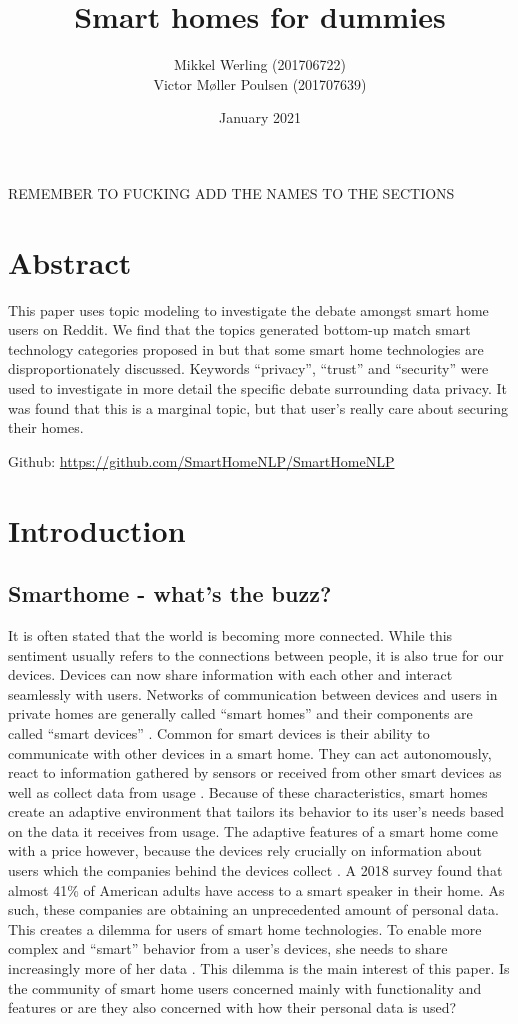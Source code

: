 \documentclass{article}
\title{Smart homes for dummies}
\author{Mikkel Werling (201706722) \\ Victor Møller Poulsen (201707639)}
\date{January 2021}
\begin{document}
    \maketitle
    REMEMBER TO FUCKING ADD THE NAMES TO THE SECTIONS 
    \section{Abstract}
    This paper uses topic modeling to investigate the debate amongst smart home users on Reddit. We find that the topics generated bottom-up match smart technology categories proposed in  but that some smart home technologies are disproportionately discussed. Keywords “privacy”, “trust” and “security” were used to investigate in more detail the specific debate surrounding data privacy. It was found that this is a marginal topic, but that user’s really care about securing their homes.  
    \begin{center}
    Github: \url{https://github.com/SmartHomeNLP/SmartHomeNLP}
\end{center}

    \section{Introduction}
    \subsection{Smarthome - what's the buzz?}
    It is often stated that the world is becoming more connected. While this sentiment usually refers to the connections between people, it is also true for our devices. Devices can now share information with each other and interact seamlessly with users. Networks of communication between devices and users in private homes are generally called “smart homes” and their components are called “smart devices” \cite{novak2019relationship}. Common for 
smart devices is their ability to communicate with other devices in a smart home. They can act autonomously, react to information gathered by sensors or received from other smart devices as well as collect data from usage \cite{hubert2020take}. Because of these characteristics, smart homes create an adaptive environment that tailors its behavior to its user’s needs based on the data it receives from usage. The adaptive features of a smart home come with a price however, because the devices rely crucially on information about users which the companies behind the devices collect \cite{novak2019relationship}. A 2018 survey \cite{perez_smart_2018} found that almost 41\% of American adults have access to a smart speaker in their home. As such, these companies are obtaining an unprecedented amount of personal data. This creates a dilemma for users of smart home technologies. To enable more complex and “smart” behavior from a user’s devices, she needs to share increasingly more of her data \cite{hubert2020take}. This dilemma is the main interest of this paper. Is the community of smart home users concerned mainly with functionality and features or are they also concerned with how their personal data is used?
\end{document}
